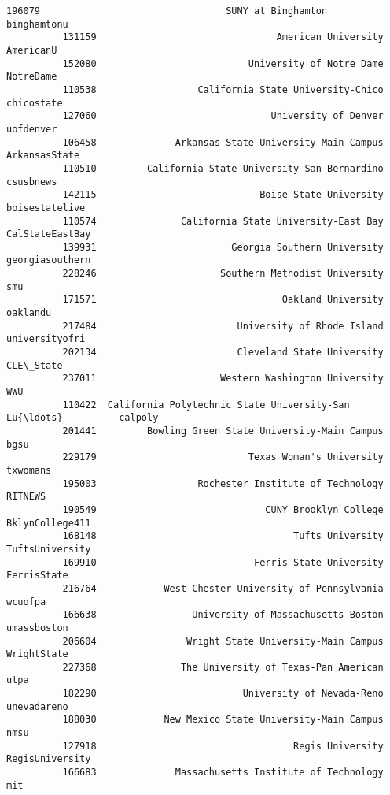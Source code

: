 \documentclass[11pt]{article}
\begin{document}
\begin{Verbatim}[commandchars=\\\{\}]
          196079                                 SUNY at Binghamton      binghamtonu   
          131159                                American University        AmericanU   
          152080                           University of Notre Dame        NotreDame   
          110538                  California State University-Chico       chicostate   
          127060                               University of Denver        uofdenver   
          106458              Arkansas State University-Main Campus    ArkansasState   
          110510         California State University-San Bernardino        csusbnews   
          142115                             Boise State University   boisestatelive   
          110574               California State University-East Bay  CalStateEastBay   
          139931                        Georgia Southern University  georgiasouthern   
          228246                      Southern Methodist University              smu   
          171571                                 Oakland University         oaklandu   
          217484                         University of Rhode Island   universityofri   
          202134                         Cleveland State University        CLE\_State   
          237011                      Western Washington University              WWU   
          110422  California Polytechnic State University-San Lu{\ldots}          calpoly   
          201441         Bowling Green State University-Main Campus             bgsu   
          229179                           Texas Woman's University         txwomans   
          195003                  Rochester Institute of Technology          RITNEWS   
          190549                              CUNY Brooklyn College  BklynCollege411   
          168148                                   Tufts University  TuftsUniversity   
          169910                            Ferris State University      FerrisState   
          216764            West Chester University of Pennsylvania          wcuofpa   
          166638                 University of Massachusetts-Boston      umassboston   
          206604                Wright State University-Main Campus      WrightState   
          227368               The University of Texas-Pan American             utpa   
          182290                          University of Nevada-Reno      unevadareno   
          188030            New Mexico State University-Main Campus             nmsu   
          127918                                   Regis University  RegisUniversity   
          166683              Massachusetts Institute of Technology              mit   

\end{Verbatim}
\end{document}
